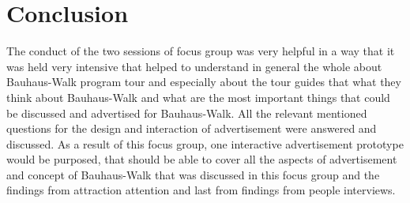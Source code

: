 \section{Conclusion}
The conduct of the two sessions of focus group was very helpful in a way that it was held very intensive that helped to understand in general the whole about Bauhaus-Walk program tour and especially about the tour guides that what they think about Bauhaus-Walk and what are the most important things that could be discussed and advertised for Bauhaus-Walk. All the relevant mentioned questions for the design and interaction of advertisement were answered and discussed. As a result of this focus group, one interactive advertisement prototype would be purposed, that should be able to cover all the aspects of advertisement and concept of Bauhaus-Walk that was discussed in this focus group and the findings from attraction attention and last from findings from people interviews.
